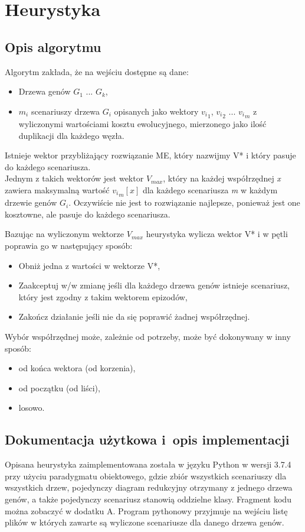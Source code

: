 \documentclass[licencjacka]{pracamgr}
\begin{document}
\chapter{Heurystyka}\label{r:heurystyka}

\section{Opis algorytmu}

Algorytm zakłada, że na wejściu dostępne są dane:
\begin{itemize}
\item Drzewa genów $G_1$ ... $G_k$,
\item $m_i$ scenariuszy drzewa $G_i$ opisanych jako wektory ${v_i}_1$, ${v_i}_2$ ... ${v_i}_m$ z wyliczonymi wartościami kosztu ewolucyjnego, mierzonego jako ilość duplikacji dla każdego węzła.
\end{itemize}
Istnieje wektor przybliżający rozwiązanie ME, który nazwijmy V* i który pasuje do każdego scenariusza. \\
Jednym z takich wektorów jest wektor $V_{max}$, który na każdej współrzędnej \textit{x} zawiera maksymalną wartość ${{v_i}_m}[x]$ dla każdego scenariusza \textit{m} w każdym drzewie genów $G_i$. Oczywiście nie jest to rozwiązanie najlepsze, ponieważ jest one kosztowne, ale pasuje do każdego scenariusza.

Bazując na wyliczonym wektorze $V_{max}$ heurystyka wylicza wektor V* i w pętli poprawia go w następujący sposób:
\begin{itemize}
\item Obniż jedna z wartości w wektorze V*,
\item Zaakceptuj w/w zmianę jeśli dla każdego drzewa genów istnieje scenariusz, który jest zgodny z takim wektorem epizodów,
\item Zakończ działanie jeśli nie da się poprawić żadnej współrzędnej.
\end{itemize}
Wybór współrzędnej może, zależnie od potrzeby, może być dokonywany w inny sposób:
\begin{itemize}
\item od końca wektora (od korzenia),
\item od początku (od liści),
\item losowo.
\end{itemize}

\section{Dokumentacja użytkowa i~opis implementacji}\label{r:impl}
Opisana heurystyka zaimplementowana została w języku Python w wersji 3.7.4 przy użyciu paradygmatu obiektowego, gdzie zbiór wszystkich scenariuszy dla wszystkich drzew, pojedynczy diagram redukcyjny otrzymany z jednego drzewa genów, a także pojedynczy scenariusz stanowią oddzielne klasy. Fragment kodu można zobaczyć w dodatku A. Program pythonowy przyjmuje na wejściu listę plików w których zawarte są wyliczone scenariusze dla danego drzewa genów.
\end{document}
